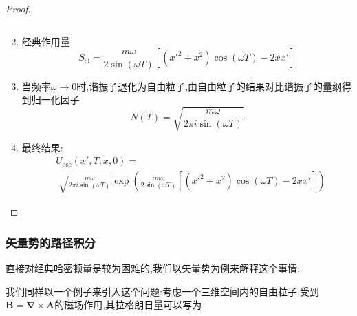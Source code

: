 \begin{remark}
\begin{proof}
\begin{enumerate}
\begin{equation}
            \end{equation}
            \item 经典作用量
            \begin{equation}
                S_{\text{cl}} = \frac{m\omega}{2\sin(\omega T)} \left[(x'^2 + x^2)\cos(\omega T) - 2xx'\right]
            \end{equation}
            \item 当频率$\omega\to0$时,谐振子退化为自由粒子,由自由粒子的结果对比谐振子的量纲得到归一化因子
            \begin{equation}
                N(T) = \sqrt{\frac{m\omega}{2\pi i \sin(\omega T)}}
            \end{equation}
            \item 最终结果:
            \begin{equation}
                \begin{aligned}
                    &U_{\text{osc}}(x', T; x, 0) =\\
                    &\;\sqrt{\frac{m\omega}{2\pi i \sin(\omega T)}} \exp\left( \frac{i m\omega}{2 \sin(\omega T)} \left[ (x'^2 + x^2)\cos(\omega T) - 2xx' \right] \right)
                \end{aligned}
            \end{equation}
        \end{enumerate}
    \end{proof}
\end{remark}
\subsubsection{矢量势的路径积分}
直接对经典哈密顿量是较为困难的,我们以矢量势为例来解释这个事情:

我们同样以一个例子来引入这个问题:考虑一个三维空间内的自由粒子,受到$\mathbf{B}=\mathbf{\nabla}\times\mathbf{A}$的磁场作用,其拉格朗日量可以写为\\

